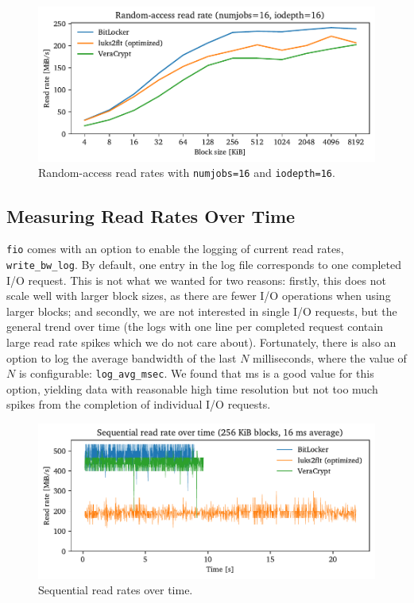 \begin{figure}[htb!]
	\center
	\includegraphics[scale=1]{../fig/performance.hwexperiments.optrandthreadsqueue.pdf}
	\caption[
		Random-access read rates with \texttt{numjobs=16} and \texttt{iodepth=16}
	]{
		Random-access read rates with \texttt{numjobs=16} and \texttt{iodepth=16}. 
	}
	\label{fig:performance.hwexperiments.optrandthreadsqueue}
\end{figure}

\clearpage
\subsection{Measuring Read Rates Over Time}
\label{chap:performance.hwexperiments.readrateovertime}
\texttt{fio} comes with an option to enable the logging of current read rates, \texttt{write\_bw\_log}. By default, one entry in the log file corresponds to one completed I/O request. This is not what we wanted for two reasons: firstly, this does not scale well with larger block sizes, as there are fewer I/O operations when using larger blocks; and secondly, we are not interested in single I/O requests, but the general trend over time (the logs with one line per completed request contain large read rate spikes which we do not care about). Fortunately, there is also an option to log the average bandwidth of the last $N$ milliseconds, where the value of $N$ is configurable: \texttt{log\_avg\_msec}. We found that  ms is a good value for this option, yielding data with reasonable high time resolution but not too much spikes from the completion of individual I/O requests.

\begin{figure}[htb!]
	\center
	\includegraphics[scale=1]{../fig/performance.hwexperiments.seqovertime.pdf}
	\caption[
		Sequential read rates over time
	]{
		Sequential read rates over time.  
	}
	\label{fig:performance.hwexperiments.seqovertime}
\end{figure}


